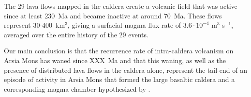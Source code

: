\documentclass[12pt,letter]{article}
\begin{document}
The 29 lava flows mapped in the caldera create a volcanic field that was active since at least 230~Ma and became inactive at around 70~Ma. These flows represent 30-400~km$^3$, giving a surfacial magma flux rate of $3.6\cdot 10^{-4}$ m$^3$ s$^{-1}$, averaged over the entire history of the 29 events.

Our main conclusion is that the recurrence rate of intra-caldera volcanism on Arsia Mons has waned since XXX~Ma and that this waning, as well as the presence of distributed lava flows in the caldera alone, represent the tail-end of an episode of activity in Arsia Mons that formed the large basaltic caldera and a corresponding magma chamber hypothesized by \citet{wilson2001evidence}.









\end{document}
